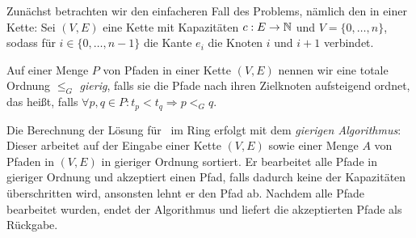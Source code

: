 Zunächst betrachten wir den einfacheren Fall des Problems, nämlich den in einer Kette:
Sei $(V,E)$ eine Kette mit Kapazitäten $c: E \to \mathbb N$ und $V=\{0,\dots,n\}$, sodass für $i \in \{0,\dots,n-1\}$
die Kante $e_i$ die Knoten $i$ und $i+1$ verbindet.
\begin{definition}
    Auf einer Menge $P$ von Pfaden in einer Kette $(V,E)$ nennen wir eine totale Ordnung $\leq_G$ {\em gierig},
    falls sie die Pfade nach ihren Zielknoten aufsteigend ordnet, das heißt, falls
    $\forall p, q \in P \colon t_p < t_q \Rightarrow p <_G q$.
\end{definition}
Die Berechnung der Lösung für \CallControl\ im Ring erfolgt mit dem {\em gierigen Algorithmus}: 
Dieser arbeitet auf der Eingabe einer Kette $(V,E)$ sowie einer Menge $A$ von Pfaden in $(V,E)$ in gieriger Ordnung sortiert. 
Er bearbeitet alle Pfade in gieriger Ordnung und akzeptiert einen Pfad, falls dadurch keine der Kapazitäten
überschritten wird, ansonsten lehnt er den Pfad ab.
Nachdem alle Pfade bearbeitet wurden, endet der Algorithmus und liefert die akzeptierten Pfade als Rückgabe.

